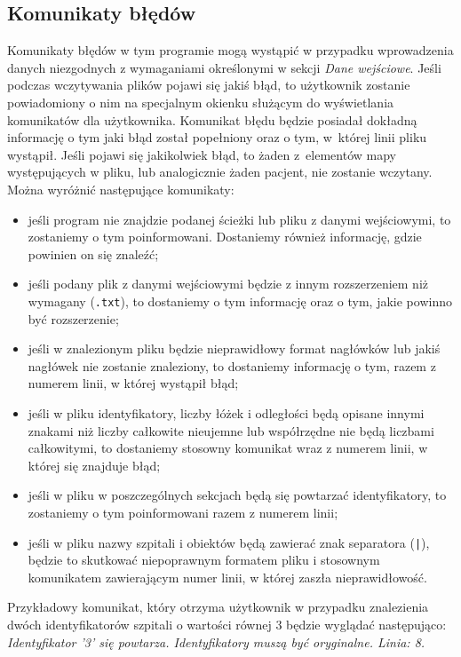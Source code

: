 \documentclass[12pt,a4paper]{article}
\begin{document}
\subsection{Komunikaty błędów}
Komunikaty błędów w tym programie mogą wystąpić w przypadku wprowadzenia danych niezgodnych z wymaganiami określonymi w sekcji \textit{Dane wejściowe}. Jeśli podczas wczytywania plików pojawi się jakiś błąd, to użytkownik zostanie powiadomiony o nim na specjalnym okienku służącym do wyświetlania komunikatów dla użytkownika. Komunikat błędu będzie posiadał dokładną informację o tym jaki błąd został popełniony oraz o tym, w~której linii pliku wystąpił. Jeśli pojawi się jakikolwiek błąd, to żaden z~elementów mapy występujących w pliku, lub analogicznie żaden pacjent, nie zostanie wczytany.
Można wyróżnić następujące komunikaty:
\begin{itemize}
\item jeśli program nie znajdzie podanej ścieżki lub pliku z danymi wejściowymi, to zostaniemy o tym poinformowani. Dostaniemy również informację, gdzie powinien on się znaleźć; 
\item jeśli podany plik z danymi wejściowymi będzie z innym rozszerzeniem niż wymagany (\texttt{.txt}), to dostaniemy o tym informację oraz o tym, jakie powinno być rozszerzenie;
\item jeśli w znalezionym pliku będzie nieprawidłowy format nagłówków lub jakiś nagłówek nie zostanie znaleziony, to dostaniemy informację o tym, razem z numerem linii, w której wystąpił błąd;
\item jeśli w pliku identyfikatory, liczby łóżek i odległości będą opisane innymi znakami niż liczby całkowite nieujemne lub współrzędne nie będą liczbami całkowitymi, to dostaniemy stosowny komunikat wraz z numerem linii, w której się znajduje błąd;
\item jeśli w pliku w poszczególnych sekcjach będą się powtarzać identyfikatory, to zostaniemy o tym poinformowani razem z numerem linii;
\item jeśli w pliku nazwy szpitali i obiektów będą zawierać znak separatora (\texttt{|}), będzie to skutkować niepoprawnym formatem pliku i stosownym komunikatem zawierającym numer linii, w której zaszła nieprawidłowość.
\end{itemize}

Przykładowy komunikat, który otrzyma użytkownik w przypadku znalezienia dwóch identyfikatorów szpitali o wartości równej 3 będzie wyglądać następująco:\\
\textit{Identyfikator '3' się powtarza. Identyfikatory muszą być oryginalne. Linia: 8.}
\end{document}
